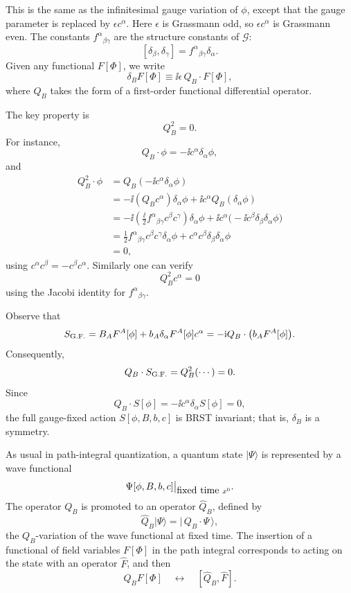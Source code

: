 This is the same as the infinitesimal gauge variation of \(\phi\), except
that the gauge parameter is replaced by \(\epsilon c^\alpha\).  Here
\(\epsilon\) is Grassmann odd, so \(\epsilon c^\alpha\) is Grassmann even.
The constants \(f^\alpha{}_{\beta\gamma}\) are the structure constants of
\(\mathcal G\):
\[
  [\delta_\beta,\delta_\gamma]
  =
  f^\alpha{}_{\beta\gamma}\delta_\alpha.
\]
Given any functional \(F[\Phi]\), we write
\[
  \delta_B F[\Phi]
  \equiv
  \ii\epsilon\, Q_B\cdot F[\Phi],
\]
where \(Q_B\) takes the form of a first-order functional differential
operator.

The key property is
\[
  Q_B^2=0.
\]
For instance,
\[
  Q_B\cdot\phi=-\ii c^\alpha\delta_\alpha\phi,
\]
and
\[
\begin{aligned}
  Q_B^2\cdot\phi
  &=
  Q_B(-\ii c^\alpha\delta_\alpha\phi)
\\
  &=
  -\ii(Q_Bc^\alpha)\delta_\alpha\phi
  +\ii c^\alpha Q_B(\delta_\alpha\phi)
\\
  &=
  -\ii\left(
    \frac{\ii}{2}f^\alpha{}_{\beta\gamma}
    c^\beta c^\gamma
  \right)\delta_\alpha\phi
  +\ii c^\alpha
  \bigl(-\ii c^\beta\delta_\beta\delta_\alpha\phi\bigr)
\\
  &=
  \frac12 f^\alpha{}_{\beta\gamma}c^\beta c^\gamma
  \delta_\alpha\phi
  +c^\alpha c^\beta\delta_\beta\delta_\alpha\phi
\\
  &=0,
\end{aligned}
\]
using \(c^\alpha c^\beta=-c^\beta c^\alpha\).  Similarly one can verify
\[
  Q_B^2 c^\alpha=0
\]
using the Jacobi identity for \(f^\alpha{}_{\beta\gamma}\).

Observe that
\[
  S_{\rm G.F.}
  =
  B_A F^A[\phi]
  +b_A\delta_\alpha F^A[\phi]c^\alpha
  =
  -\mathrm{i} Q_B\cdot\bigl(b_A F^A[\phi]\bigr).
\]
Consequently,
\[
  Q_B\cdot S_{\rm G.F.}=Q_B^2(\cdots)=0.
\]
Since
\[
  Q_B\cdot S[\phi]
  =
  -\ii c^\alpha\delta_\alpha S[\phi]
  =
  0,
\]
the full gauge-fixed action \(S[\phi,B,b,c]\) is BRST invariant; that is,
\(\delta_B\) is a symmetry.

As usual in path-integral quantization, a quantum state \(|\Psi\rangle\)
is represented by a wave functional
\[
  \Psi[\phi,B,b,c]\big|_{\hbox{fixed time }x^0}.
\]
The operator \(Q_B\) is promoted to an operator \(\widehat Q_B\), defined
by
\[
  \widehat Q_B|\Psi\rangle
  =
  |\,Q_B\cdot\Psi\,\rangle,
\]
the \(Q_B\)-variation of the wave functional at fixed time.  The
insertion of a functional of field variables \(F[\Phi]\) in the path
integral corresponds to acting on the state with an operator
\(\widehat F\), and then
\[
  Q_B F[\Phi]
  \quad\longleftrightarrow\quad
  [\widehat Q_B,\widehat F].
\]

